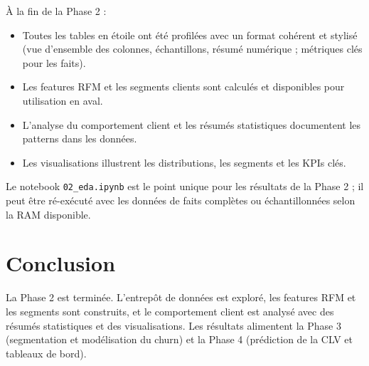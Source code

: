 \documentclass[11pt,a4paper]{article}
\begin{document}
À la fin de la Phase 2 :
\begin{itemize}[noitemsep]
  \item Toutes les tables en étoile ont été profilées avec un format cohérent et stylisé (vue d'ensemble des colonnes, échantillons, résumé numérique ; métriques clés pour les faits).
  \item Les features RFM et les segments clients sont calculés et disponibles pour utilisation en aval.
  \item L'analyse du comportement client et les résumés statistiques documentent les patterns dans les données.
  \item Les visualisations illustrent les distributions, les segments et les KPIs clés.
\end{itemize}

Le notebook \texttt{02\_eda.ipynb} est le point unique pour les résultats de la Phase 2 ; il peut être ré-exécuté avec les données de faits complètes ou échantillonnées selon la RAM disponible.

\section{Conclusion}

La Phase 2 est terminée. L'entrepôt de données est exploré, les features RFM et les segments sont construits, et le comportement client est analysé avec des résumés statistiques et des visualisations. Les résultats alimentent la Phase 3 (segmentation et modélisation du churn) et la Phase 4 (prédiction de la CLV et tableaux de bord).
\end{document}
